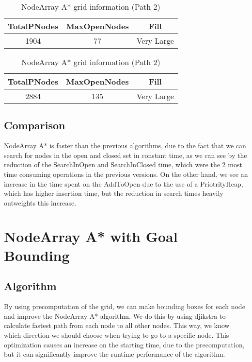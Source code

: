 \documentclass{article}
\begin{document}
  \begin{table}[h!]
    \parbox{.45\linewidth}{
        \centering
        \caption{NodeArray A* grid information (Path 1)}
        \label{tab:tableNodeArrayGrid1}
        \begin{tabular}{c|c|c}
          \textbf{TotalPNodes} & \textbf{MaxOpenNodes} & \textbf{Fill}\\
          \hline
          1904 & 77 & Very Large\\
        \end{tabular}
    }
    \hfil
    \parbox{.45\linewidth}{
        \centering
        \caption{NodeArray A* grid information (Path 2)}
        \label{tab:tableNodeArrayGrid2}
        \begin{tabular}{c|c|c}
          \textbf{TotalPNodes} & \textbf{MaxOpenNodes} & \textbf{Fill}\\
          \hline
          2884 & 135 & Very Large\\
        \end{tabular}
    }
  \end{table}

  \subsection{Comparison}
  NodeArray A* is faster than the previous algorithms, due to the fact that we can search for nodes in the open and closed set in constant time, 
  as we can see by the reduction of the SearchInOpen and SearchInClosed time, which were the 2 most time consuming operations in the previous versions. 
  On the other hand, we see an increase in the time spent on the AddToOpen due to the use of a PriotrityHeap, which has higher insertion time, 
  but the reduction in search times heavily outweights this increase.\\

  \section{NodeArray A* with Goal Bounding}
  \subsection{Algorithm}
  By using precomputation of the grid, we can make bounding boxes for each node and improve the NodeArray A* algorithm. We do this by using djikstra to
  calculate fastest path from each node to all other nodes. This way, we know which direction we should choose when trying to go to a specific node.
  This optimization causes an increase on the starting time, due to the precomputation, but it can significantly improve the runtime performance of the algorithm.\\
  
\end{document}
